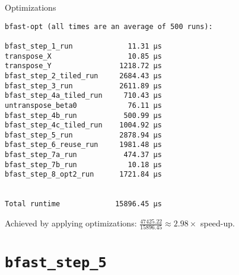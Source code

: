 \begin{frame}[fragile]{Optimizations}


\centering

\begin{verbatim}
bfast-opt (all times are an average of 500 runs):

bfast_step_1_run             11.31 µs
transpose_X                  10.85 µs
transpose_Y                1218.72 µs
bfast_step_2_tiled_run     2684.43 µs
bfast_step_3_run           2611.89 µs
bfast_step_4a_tiled_run     710.43 µs
untranspose_beta0            76.11 µs
bfast_step_4b_run           500.99 µs
bfast_step_4c_tiled_run    1004.92 µs
bfast_step_5_run           2878.94 µs
bfast_step_6_reuse_run     1981.48 µs
bfast_step_7a_run           474.37 µs
bfast_step_7b_run            10.18 µs
bfast_step_8_opt2_run      1721.84 µs


Total runtime             15896.45 µs
\end{verbatim}


%
%
%

\pause
Achieved by applying optimizations:
\(\frac{47425.22}{15896.45} \approx 2.98 \times \) speed-up.



\end{frame}


\section{\texttt{bfast\_step\_5}} %


